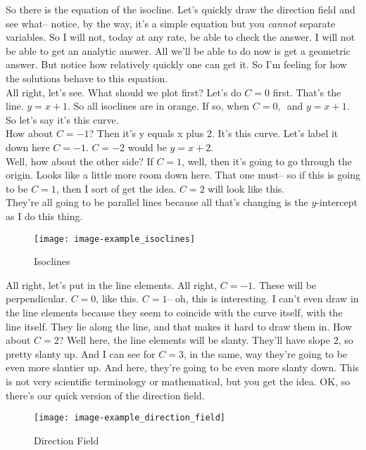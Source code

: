 So there is the equation of the isocline.
Let's quickly draw the direction field and see what--
notice, by the way, it's a simple equation but you \textit{cannot} separate variables.
So I will not, today at any rate, be able to check the answer.
I will not be able to get an analytic answer.
All we'll be able to do now is get a geometric answer.
But notice how relatively quickly one can get it.
So I'm feeling for how the solutions behave to this equation.\\

All right, let's see. What should we plot first?
Let's do $C = 0$ first.
That's the line. $y = x + 1$.
So all isoclines are in orange.
If so, when $C = 0,\,$ and $y = x +  1$.
So let's say it's this curve.\\
How about $C = -1$?
Then it's y equals x plus 2. It's this curve.
Let's label it down here $C = -1$.
$C = -2$ would be $y = x + 2$. \\
Well, how about the other side? If $C = 1$, well, then it's going to go through the origin.
Looks like a little more room down here.
That one must-- so if this is going to be $C = 1$,
then I sort of get the idea. $C = 2$ will look like this. \\
They're all going to be parallel lines
because all that's changing is the $y$-intercept as I do this thing.

\begin{figure}[ht!]
  \centering
  \texttt{[image: image-example\_isoclines]}
  \caption{Isoclines}
\end{figure}

\clearpage

All right, let's put in the line elements.
All right, $C = -1$. These will be perpendicular.
$C = 0$, like this. $C = 1$-- oh, this is interesting.
I can't even draw in the line elements because they seem to coincide with the curve itself,
with the line itself.
They lie along the line, and that makes it hard to draw them in.
How about $C = 2$?
Well here, the line elements will be slanty.
They'll have slope $2$, so pretty slanty up.
And I can see for $C = 3$, in the same, way they're going to be even more slantier up.
And here, they're going to be even more slanty down.
This is not very scientific terminology or mathematical, but you get the idea.
OK, so there's our quick version of the direction field.

\begin{figure}[ht!]
  \centering
  \texttt{[image: image-example\_direction\_field]}
  \caption{Direction Field}
\end{figure}


